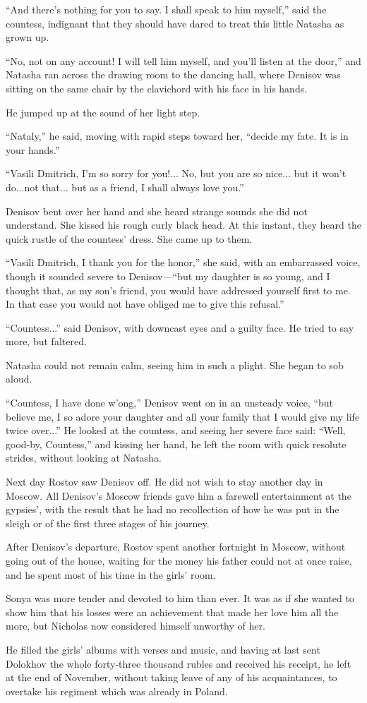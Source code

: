 ``And there's nothing for you to say. I shall speak to him
myself,'' said the countess, indignant that they should have
dared to treat this little Natasha as grown up.

``No, not on any account! I will tell him myself, and you'll
listen at the door,'' and Natasha ran across the drawing room to
the dancing hall, where Denisov was sitting on the same chair by
the clavichord with his face in his hands.

He jumped up at the sound of her light step.

``Nataly,'' he said, moving with rapid steps toward her, ``decide
my fate.  It is in your hands.''

``Vasili Dmitrich, I'm so sorry for you!... No, but you are so
nice...  but it won't do...not that... but as a friend, I shall
always love you.''

Denisov bent over her hand and she heard strange sounds she did
not understand. She kissed his rough curly black head. At this
instant, they heard the quick rustle of the countess' dress. She
came up to them.

``Vasili Dmitrich, I thank you for the honor,'' she said, with an
embarrassed voice, though it sounded severe to Denisov---``but my
daughter is so young, and I thought that, as my son's friend, you
would have addressed yourself first to me. In that case you would
not have obliged me to give this refusal.''

``Countess...'' said Denisov, with downcast eyes and a guilty
face. He tried to say more, but faltered.

Natasha could not remain calm, seeing him in such a plight. She
began to sob aloud.

``Countess, I have done w'ong,'' Denisov went on in an unsteady
voice, ``but believe me, I so adore your daughter and all your
family that I would give my life twice over...'' He looked at the
countess, and seeing her severe face said: ``Well, good-by,
Countess,'' and kissing her hand, he left the room with quick
resolute strides, without looking at Natasha.

Next day Rostov saw Denisov off. He did not wish to stay another
day in Moscow. All Denisov's Moscow friends gave him a farewell
entertainment at the gypsies', with the result that he had no
recollection of how he was put in the sleigh or of the first
three stages of his journey.

After Denisov's departure, Rostov spent another fortnight in
Moscow, without going out of the house, waiting for the money his
father could not at once raise, and he spent most of his time in
the girls' room.

Sonya was more tender and devoted to him than ever. It was as if
she wanted to show him that his losses were an achievement that
made her love him all the more, but Nicholas now considered
himself unworthy of her.

He filled the girls' albums with verses and music, and having at
last sent Dolokhov the whole forty-three thousand rubles and
received his receipt, he left at the end of November, without
taking leave of any of his acquaintances, to overtake his
regiment which was already in Poland.

